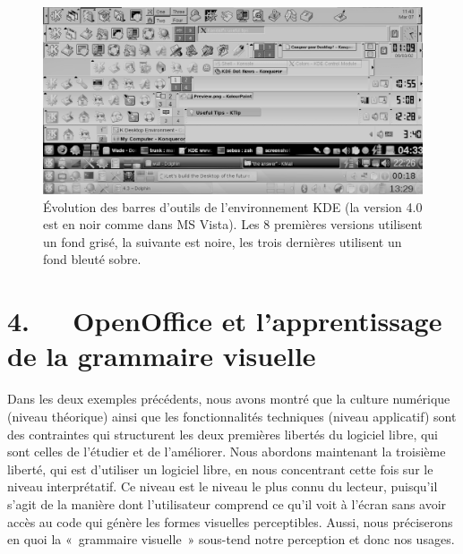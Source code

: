 \documentclass{FramateX}
\begin{document}
\begin{refsection}
\begin{figure}
\centering
\includegraphics[scale=0.28]{images/images_thulin/kde_barre_outils.png} 
\caption{Évolution des barres d'outils de l'environnement KDE (la version 4.0 est en noir comme dans MS Vista). Les 8 premières versions utilisent un fond grisé, la suivante est noire, les trois dernières utilisent un fond bleuté sobre.}
\end{figure}


\section*{4.~~~OpenOffice et l'apprentissage de la grammaire visuelle}
{}

Dans les deux exemples précédents, nous avons montré que la culture
numérique (niveau théorique) ainsi que les fonctionnalités techniques
(niveau applicatif) sont des contraintes qui structurent les deux
premières libertés du logiciel libre, qui sont celles de l'étudier et
de l'améliorer. Nous abordons maintenant la troisième liberté, qui est
d'utiliser un logiciel libre, en nous concentrant cette fois sur le
niveau interprétatif. Ce niveau est le niveau le plus connu du lecteur,
puisqu'il s'agit de la manière dont l'utilisateur comprend ce qu'il
voit à l'écran sans avoir accès au code qui génère les formes visuelles
perceptibles. Aussi, nous préciserons en quoi la «~grammaire visuelle~»
sous-tend notre perception et donc nos usages. 


\end{refsection}
\end{document}
